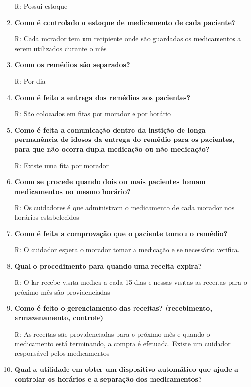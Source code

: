 \begin{apendicesenv}
\begin{enumerate}
    R: Possui estoque
    
    \item \textbf{Como é controlado o estoque de medicamento de cada paciente?}
    
    R: Cada morador tem um recipiente onde são guardadas os medicamentos a serem utilizados durante o mês
    
    \item \textbf{Como os remédios são separados?}
    
    R: Por dia
    
    \item \textbf{Como é feito a entrega dos remédios aos pacientes?}
    
    R: São colocados em fitas por morador e por horário
    
    \item \textbf{Como é feita a comunicação dentro da instição de longa permanência de idosos da entrega do remédio para os pacientes, para que não ocorra dupla medicação ou não medicação?}
    
    R: Existe uma fita por morador
    
    \item \textbf{Como se procede quando dois ou mais pacientes tomam medicamentos no mesmo horário?}
    
    R: Os cuidadores é que administram o medicamento de cada morador nos horários estabelecidos
    
    \item \textbf{Como é feita a comprovação que o paciente tomou o remédio?}
    
    R: O cuidador espera o morador tomar a medicação e se necessário verifica.
    
    \item \textbf{Qual o procedimento para quando uma receita expira?}
    
    R: O lar recebe visita medica a cada 15 dias e nessas visitas as receitas para o próximo mês são providenciadas
    
    \item \textbf{Como é feito o gerenciamento das receitas? (recebimento, armazenamento, controle)}
    
    R: As receitas são providenciadas para o próximo mês e quando o medicamento está terminando, a compra é efetuada. Existe um cuidador responsável pelos medicamentos
    
    \item \textbf{Qual a utilidade em obter um dispositivo automático que ajude a controlar os horários e a separação dos medicamentos?}
    

\end{enumerate}
\end{apendicesenv}
